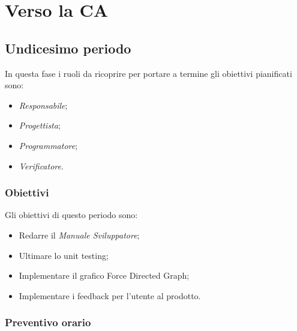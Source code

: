 \newpage
\section{Verso la CA}

\subsection{Undicesimo periodo}

In questa fase i ruoli da ricoprire per portare a termine gli obiettivi pianificati sono:
\begin{itemize}
    \item \textit{Responsabile};
    \item \textit{Progettista};
    \item \textit{Programmatore};
    \item \textit{Verificatore}.
\end{itemize}

\subsubsection{Obiettivi}
Gli obiettivi di questo periodo sono:
\begin{itemize}
    \item Redarre il \textit{Manuale Sviluppatore};
    \item Ultimare lo unit testing;
    \item Implementare il grafico Force Directed Graph;
    \item Implementare i feedback per l'utente al prodotto.

\end{itemize}

\subsubsection{Preventivo orario}

